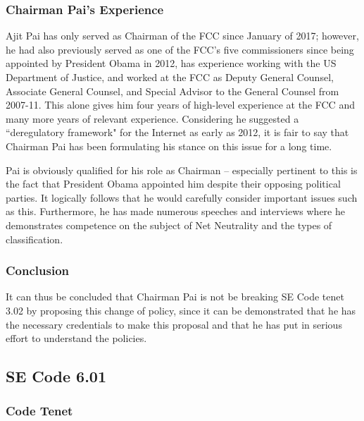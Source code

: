 \documentclass[12pt]{article}
\begin{document}
\begin{multicols}{2}
  \subsubsection{Chairman Pai's Experience}
  Ajit Pai has only served as Chairman of the FCC since January of 2017; however, he had also previously served as one of the FCC's five commissioners since being appointed by President Obama in 2012, has experience working with the US Department of Justice, and worked at the FCC as Deputy General Counsel, Associate General Counsel, and Special Advisor to the General Counsel from 2007-11.\cite{pai-fcc-page} This alone gives him four years of high-level experience at the FCC and many more years of relevant experience. Considering he suggested a ``deregulatory framework" for the Internet as early as 2012, it is fair to say that Chairman Pai has been formulating his stance on this issue for a long time.\cite{pai-early-statement}
  
Pai is obviously qualified for his role as Chairman -- especially pertinent to this is the fact that President Obama appointed him despite their opposing political parties.\cite{pai-fcc-page} It logically follows that he would carefully consider important issues such as this. Furthermore, he has made numerous speeches and interviews where he demonstrates competence on the subject of Net Neutrality and the types of classification.\cite{npr-pai-makes-case, pbs-pai-makes-case, pai-fcc-page}

\subsubsection{Conclusion}
It can thus be concluded that Chairman Pai is not be breaking SE Code tenet 3.02 by proposing this change of policy, since it can be demonstrated that he has the necessary credentials to make this proposal and that he has put in serious effort to understand the policies.

  
\subsection{SE Code 6.01}
\subsubsection{Code Tenet}
  

\end{multicols}
\end{document}
